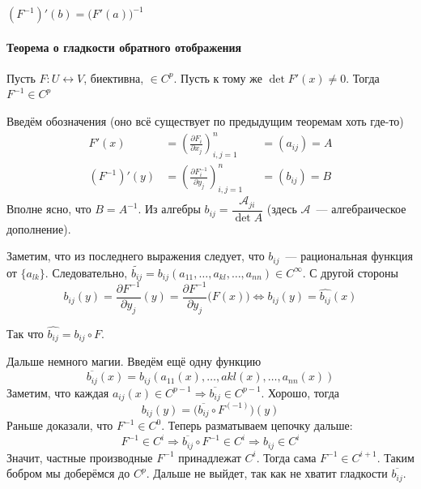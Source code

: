 \documentclass[12pt,timbord]{../../../notes}
\begin{document}
\begin{cor*}
  $\displaystyle (F^{-1})'(b) = \bigl(F'(a)\bigr)^{-1}$
\end{cor*}

\paragraph{Теорема о гладкости обратного отображения}
\label{par:diffspace::invsmooth}

\begin{thrm}\label{thrm:diffspace::invsmooth}
  Пусть $F\colon U \leftrightarrow V$, биективна, $\in C^p$. Пусть к тому же $\det F'(x) \neq 0$.
  Тогда $F^{-1} \in C^p$
\end{thrm}
\begin{ittproof}
  Введём обозначения (оно всё существует по предыдущим теоремам хоть где-то)
  \[
    \begin{aligned}
      F'(x) &= \left(\frac{\partial F_i}{\partial x_j}\right)_{i,j=1}^n & &= (a_{ij}) = A \\
      (F^{-1})'(y) &= \left(\frac{\partial F^{-1}_i}{\partial y_j}\right)_{i,j=1}^n & &= (b_{ij}) = B 
    \end{aligned}
  \]
  Вполне ясно, что $B = A^{-1}$. Из алгебры $b_{ij} = \dfrac{\mathcal A_{ji}}{\det A}$ 
  (здесь $\mathcal A$~--- алгебраическое дополнение).
  
  Заметим, что из последнего выражения следует, что $b_{ij}$~--- рациональная функция от $\{a_{lk}\}$.
  Следовательно, $\widetilde{b_{ij}} = b_{ij}(a_{11}, \dotsc, a_{kl}, \dotsc, a_{nn}) \in C^\infty$.
  С другой стороны
  \[
    b_{ij}(y) = \frac{\partial F^{-1}}{\partial y_j}(y) = \frac{\partial F^{-1}}{\partial y_j}\bigl(F(x)\bigr)
    \Leftrightarrow b_{ij}(y) = \widehat{b_{ij}}(x)
  \]

  Так что $\widehat{b_{ij}} = b_{ij} \circ F$. 

  Дальше немного магии. Введём ещё одну функцию
  \[
    \overline{b_{ij}}(x) = b_{ij}(a_{11}(x), \dotsc, a{kl}(x), \dotsc, a_{nn}(x))   
  \]
  Заметим, что каждая $a_{ij}(x) \in C^{p-1} \Rightarrow \overline{b_{ij}} \in C^{p-1}$.
  Хорошо, тогда 
  \[
    b_{ij}(y) = \bigl(\overline{b_{ij}} \circ F^{(-1)}\bigr)(y) 
  \]
  Раньше доказали, что $F^{-1} \in C^0$. Теперь разматываем цепочку дальше:
  \[
    F^{-1} \in C^i \Rightarrow \overline{b_{ij}} \circ F^{-1} \in C^i \Rightarrow b_{ij} \in C^i 
  \]
  Значит, частные производные $F^{-1}$ принадлежат $C^i$. Тогда сама $F^{-1} \in C^{i+1}$.
  Таким бобром мы доберёмся до $C^p$. 
  Дальше не выйдет, так как не хватит гладкости $\overline{b_{ij}}$.
\end{ittproof}
\end{document}
